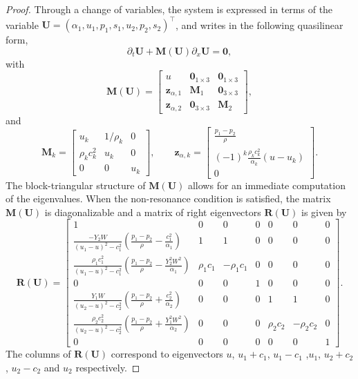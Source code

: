 \documentclass[10pt,a4paper]{amsart}
\newcommand{\mtrx}[1]{\mathbf{#1}}
\newcommand{\pth}[1]  {\left( #1 \right)}
\begin{document}
\begin{proof}
Through a change of variables, the system is expressed in terms of the variable $\bm{U}=(\alpha_1,u_1,p_1,s_1,u_2,p_2,s_2)^\top$, and writes in the following quasilinear form,
\begin{equation}\label{eq:quasilinear_form}
\partial_t\bm{U} + \mtrx{M}(\bm{U})\partial_x\bm{U}=\bm{0},
\end{equation}
with
\begin{equation}
\mtrx{M}(\bm{U}) = 
\begin{bmatrix}
u & \bm{0}_{1\times3} & \bm{0}_{1\times3} \\
\bm{z}_{\alpha,1}  & \mtrx{M}_1 & \bm{0}_{3\times3}\\
\bm{z}_{\alpha,2}  & \bm{0}_{3\times3} & \mtrx{M}_2
\end{bmatrix},
\end{equation}
and
\begin{equation}
\mtrx{M}_k = \begin{bmatrix}
u_k & 1/\rho_k & 0 \\
\rho_k c_k^2 & u_k & 0\\
0 & 0 & u_k
\end{bmatrix},
\qquad 
\bm{z}_{\alpha,k} = 
\begin{bmatrix}
\tfrac{p_1-p_2}{\rho} \\ (-1)^k\tfrac{\rho_k c_k^2}{\alpha_k}(u-u_k)\\ 0
\end{bmatrix}.
\end{equation}
The block-triangular structure of $\mtrx{M}(\bm{U})$ allows for an immediate computation of the eigenvalues. When the non-resonance condition is satisfied, the matrix $\mtrx{M}(\bm{U})$ is diagonalizable and a matrix of right eigenvectors $\mtrx{R}(\bm{U})$ is given by
\begin{equation}\label{eq:eigenvectors}
\mathbf{R}(\bm{U})= 
\begin{bmatrix}
1 & 0 & 0 & 0 & 0 & 0 & 0 \\
\tfrac{-Y_2 W}{(u_1-u)^2-c_1^2}\pth{\tfrac{p_1-p_2}{\rho} - \tfrac{c_1^2}{\alpha_1}} & 1 & 1 & 0 & 0 & 0 & 0 \\
\tfrac{\rho_1 c_1^2}{(u_1-u)^2-c_1^2}\pth{\tfrac{p_1-p_2}{\rho} - \tfrac{Y_2^2 W^2}{\alpha_1}} & \rho_1 c_1 & -\rho_1 c_1 & 0 & 0 & 0 & 0 \\
0 & 0 & 0 & 1 & 0 & 0 & 0\\
\tfrac{Y_1 W}{(u_2-u)^2-c_2^2}\pth{\tfrac{p_1-p_2}{\rho} + \tfrac{c_2^2}{\alpha_2}} & 0 & 0 & 0 & 1 & 1 & 0\\
\tfrac{\rho_2 c_2^2}{(u_2-u)^2-c_2^2}\pth{\tfrac{p_1-p_2}{\rho} + \tfrac{Y_1^2 W^2}{\alpha_2}}  & 0 & 0 & 0 & \rho_2 c_2 & -\rho_2 c_2 & 0\\
0 & 0 & 0 & 0 & 0 & 0 & 1
\end{bmatrix}.
\end{equation} 
The columns of $\mtrx{R}(\bm{U})$ correspond to eigenvectors $u$, $u_1+c_1$, $u_1-c_1$ ,$u_1$, $u_2+c_2$, $u_2-c_2$ and $u_2$  respectively.
\end{proof}
\end{document}
